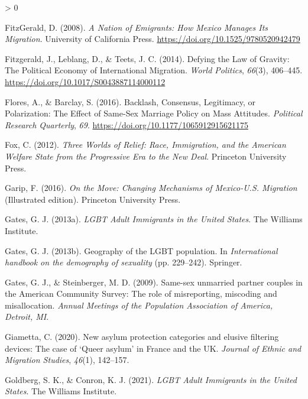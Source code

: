 \documentclass[
  12pt,
]{article}
\newlength{\cslhangindent}
\newenvironment{CSLReferences}[2] %
 {%
  \setlength{\parindent}{0pt}
  \ifodd #1 \everypar{\setlength{\hangindent}{\cslhangindent}}\ignorespaces\fi
  \ifnum #2 > 0
  \setlength{\parskip}{#2\baselineskip}
  \fi
 }%
 {}
\begin{document}
\begin{CSLReferences}{1}{0}
\leavevmode\hypertarget{ref-fitzgerald_2008}{}%
FitzGerald, D. (2008). \emph{A {Nation} of {Emigrants}: How {Mexico Manages Its Migration}}. {University of California Press}. \url{https://doi.org/10.1525/9780520942479}

\leavevmode\hypertarget{ref-fitzgerald_2014}{}%
Fitzgerald, J., Leblang, D., \& Teets, J. C. (2014). Defying the {Law} of {Gravity}: The {Political Economy} of {International Migration}. \emph{World Politics}, \emph{66}(3), 406--445. \url{https://doi.org/10.1017/S0043887114000112}

\leavevmode\hypertarget{ref-flores_2016_backlash}{}%
Flores, A., \& Barclay, S. (2016). Backlash, {Consensus}, {Legitimacy}, or {Polarization}: The {Effect} of {Same}-{Sex Marriage Policy} on {Mass Attitudes}. \emph{Political Research Quarterly}, \emph{69}. \url{https://doi.org/10.1177/1065912915621175}

\leavevmode\hypertarget{ref-fox_2012}{}%
Fox, C. (2012). \emph{Three {Worlds} of {Relief}: Race, {Immigration}, and the {American Welfare State} from the {Progressive Era} to the {New Deal}}. {Princeton University Press}.

\leavevmode\hypertarget{ref-garip_2016}{}%
Garip, F. (2016). \emph{On the {Move}: Changing {Mechanisms} of {Mexico}-{U}.{S}. {Migration}} (Illustrated edition). {Princeton University Press}.

\leavevmode\hypertarget{ref-gates_2013}{}%
Gates, G. J. (2013a). \emph{{LGBT Adult Immigrants} in the {United States}}. {The Williams Institute}.

\leavevmode\hypertarget{ref-gates_2013a}{}%
Gates, G. J. (2013b). Geography of the {LGBT} population. In \emph{International handbook on the demography of sexuality} (pp. 229--242). {Springer}.

\leavevmode\hypertarget{ref-gates_2009}{}%
Gates, G. J., \& Steinberger, M. D. (2009). Same-sex unmarried partner couples in the {American Community Survey}: The role of misreporting, miscoding and misallocation. \emph{Annual Meetings of the Population Association of America, Detroit, {MI}}.

\leavevmode\hypertarget{ref-giametta_2020}{}%
Giametta, C. (2020). New asylum protection categories and elusive filtering devices: The case of {`{Queer} asylum'} in {France} and the {UK}. \emph{Journal of Ethnic and Migration Studies}, \emph{46}(1), 142--157.

\leavevmode\hypertarget{ref-goldberg_2021}{}%
Goldberg, S. K., \& Conron, K. J. (2021). \emph{{LGBT Adult Immigrants} in the {United States}}. {The Williams Institute}.


\end{CSLReferences}
\end{document}
